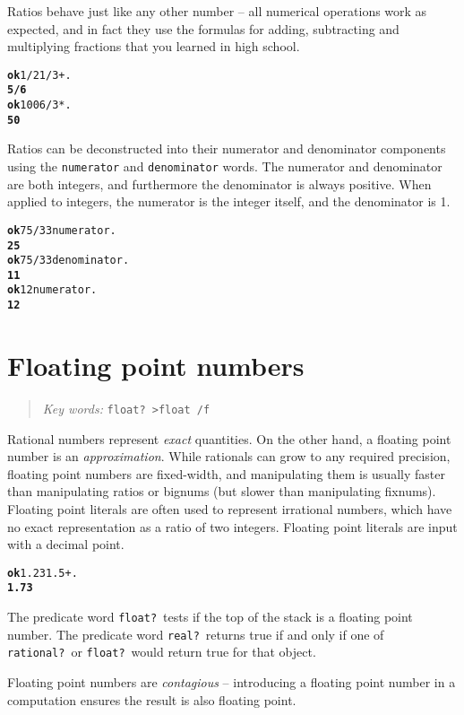 \documentclass[english]{book}
\newcommand{\chapkeywords}[1]{%
\begin{quote}
\emph{Key words:} \texttt{#1}
\end{quote}
}
\begin{document}
Ratios behave just like any other number -- all numerical operations work as expected, and in fact they use the formulas for adding, subtracting and multiplying fractions that you learned in high school.

\begin{alltt}
\textbf{ok} 1/2 1/3 + .
\textbf{5/6}
\textbf{ok} 100 6 / 3 * .
\textbf{50}
\end{alltt}

Ratios can be deconstructed into their numerator and denominator components using the \texttt{numerator} and \texttt{denominator} words. The numerator and denominator are both integers, and furthermore the denominator is always positive. When applied to integers, the numerator is the integer itself, and the denominator is 1.

\begin{alltt}
\textbf{ok} 75/33 numerator .
\textbf{25}
\textbf{ok} 75/33 denominator .
\textbf{11}
\textbf{ok} 12 numerator .
\textbf{12}
\end{alltt}

\section{Floating point numbers}

\chapkeywords{float?~>float /f}

Rational numbers represent \emph{exact} quantities. On the other hand, a floating point number is an \emph{approximation}. While rationals can grow to any required precision, floating point numbers are fixed-width, and manipulating them is usually faster than manipulating ratios or bignums (but slower than manipulating fixnums). Floating point literals are often used to represent irrational numbers, which have no exact representation as a ratio of two integers. Floating point literals are input with a decimal point.

\begin{alltt}
\textbf{ok} 1.23 1.5 + .
\textbf{1.73}
\end{alltt}

The predicate word \texttt{float?}~tests if the top of the stack is a floating point number. The predicate word \texttt{real?}~returns true if and only if one of \texttt{rational?}~or \texttt{float?}~would return true for that object.

Floating point numbers are \emph{contagious} -- introducing a floating point number in a computation ensures the result is also floating point.
\end{document}
